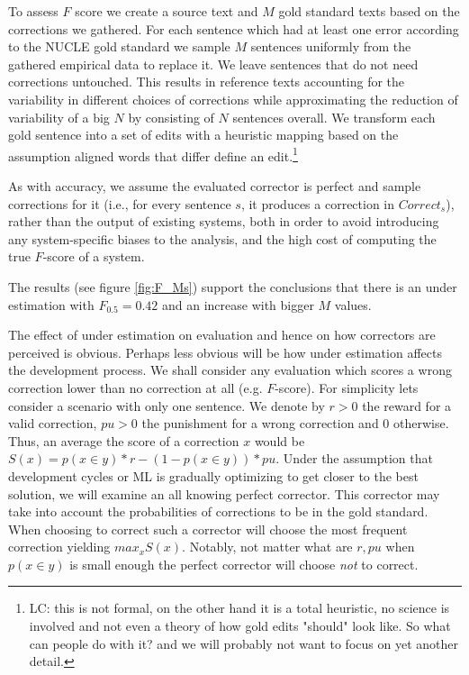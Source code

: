 \documentclass[letter,11pt]{article}
\newcommand{\lc}[1]{\footnote{\color{green}LC: #1}}
\begin{document}
		To assess $F$ score we create a source text and $M$ gold standard texts based on the corrections we gathered.
		For each sentence which had at least one error according to the NUCLE gold standard we sample $M$ sentences uniformly from the
		gathered empirical data to replace it. We leave sentences that do not need corrections untouched. This results in reference texts accounting for the variability in different choices of corrections while approximating the reduction of variability of a big $N$ by consisting of $N$ sentences overall.
		We transform each gold sentence into a set of edits with a heuristic mapping based on the assumption aligned words that differ define an edit.\lc{this is not formal, on the other hand it is a total heuristic, no science is involved and not even a theory of how gold edits "should" look like. So what can people do with it? and we will probably not want to focus on yet another detail.}
		
		As with accuracy, we assume the evaluated corrector is perfect and sample corrections for it
		(i.e., for every sentence $s$, it produces a correction in $Correct_s$),
		rather than the output of existing systems, both
		in order to avoid introducing any system-specific biases to the analysis,
		and the high cost of computing the true $F$-score of a system.
		
		The results (see figure \ref{fig:F_Ms}) support the conclusions that there is an under estimation with $F_{0.5} = 0.42$ and an increase with bigger $M$ values.
		
		
		
		The effect of under estimation on evaluation and hence on how correctors are perceived is obvious. 
		Perhaps less obvious will be how under estimation affects the development
		process. We shall consider any evaluation which scores a wrong correction lower than no correction at all (e.g. $F$-score). For simplicity lets consider a scenario with only one sentence. We denote by $r>0$ the reward for a valid correction, $pu>0$ the punishment for a wrong correction and 0 otherwise. Thus, an average the score of a correction $x$ would be $S\left(x\right) = p\left(x\in y\right)*r - \left(1-p\left(x\in y\right)\right)*pu$.
		Under the assumption that development cycles or ML is gradually optimizing to get closer to the best solution, we will examine an all knowing perfect corrector.
		This corrector may take into account the probabilities of corrections to be in the gold standard. When choosing to correct such a corrector will choose the most frequent correction yielding $max_xS\left(x\right)$. Notably, not matter what are $r,pu$ when $p\left(x\in y\right)$ is small enough the perfect corrector will choose \emph{not} to correct.
		
\end{document}
